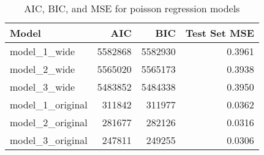 \begin{table}[ht]
\centering
\begin{tabular}{lrrr}
  \hline
Model & AIC & BIC & Test Set MSE \\ 
  \hline
model\_1\_wide & 5582868 & 5582930 & 0.3961 \\ 
  model\_2\_wide & 5565020 & 5565173 & 0.3938 \\ 
  model\_3\_wide & 5483852 & 5484338 & 0.3950 \\ 
  model\_1\_original & 311842 & 311977 & 0.0362 \\ 
  model\_2\_original & 281677 & 282126 & 0.0316 \\ 
  model\_3\_original & 247811 & 249255 & 0.0306 \\ 
   \hline
\end{tabular}
\caption{AIC, BIC, and MSE for poisson regression models} 
\label{tab:ICs}
\end{table}
